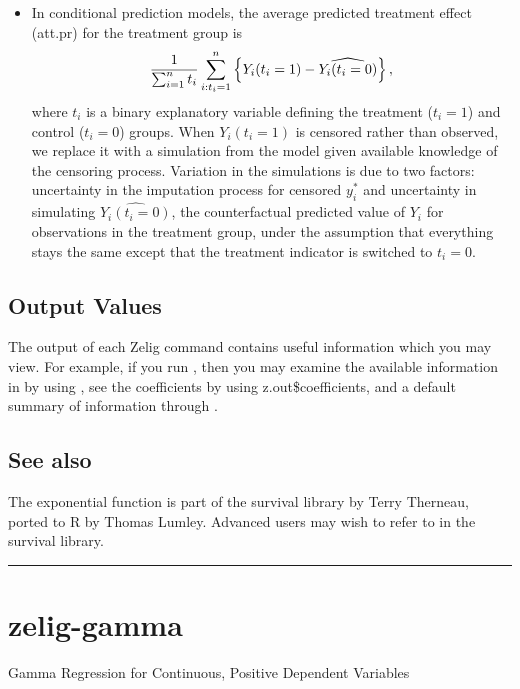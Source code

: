 \documentclass[letterpaper,10pt,english]{sphinxmanual}
\begin{document}
\begin{itemize}
\item {} 
In conditional prediction models, the average predicted treatment
effect (att.pr) for the treatment group is
\begin{gather}
\begin{split}\frac{1}{\sum_{i=1}^n t_i}\sum_{i:t_i=1}^n \left\{ Y_i(t_i=1) -
  \widehat{Y_i(t_i=0)} \right\},\end{split}\notag
\end{gather}
where \(t_i\) is a binary explanatory variable defining the
treatment (\(t_i=1\)) and control (\(t_i=0\)) groups. When
\(Y_i(t_i=1)\) is censored rather than observed, we replace it
with a simulation from the model given available knowledge of the
censoring process. Variation in the simulations is due to two
factors: uncertainty in the imputation process for censored
\(y_i^*\) and uncertainty in simulating
\(\widehat{Y_i(t_i=0)}\), the counterfactual predicted value of
\(Y_i\) for observations in the treatment group, under the
assumption that everything stays the same except that the treatment
indicator is switched to \(t_i=0\).

\end{itemize}


\subsection{Output Values}
\label{vignette:output-values}
The output of each Zelig command contains useful information which you
may view. For example, if you run
, then you may
examine the available information in  by using
, see the coefficients by using z.out\$coefficients, and
a default summary of information through .


\subsection{See also}
\label{vignette:see-also}
The exponential function is part of the survival library by Terry
Therneau, ported to R by Thomas Lumley. Advanced users may wish to refer
to  in the survival library.


\bigskip\hrule{}\bigskip



\section{zelig-gamma}
\label{vignette:zelig-gamma}
Gamma Regression for Continuous, Positive Dependent Variables
\end{document}
